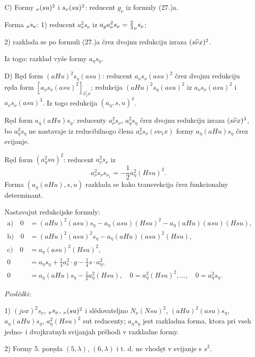 \documentclass[11pt]{article}
\let\A\relax
\newcommand{\A}{\mathfrak A}
\begin{document}
C) Formy $\A_{\nu}(\A su)^2$ i $s_{\nu}(\A su)^2$: reducent $g_{\nu}$ iz formuly (27.)a.

Forma $\A_{\nu}s_{\nu}$: 1) reducent $a_{\nu}^2s_{\nu}$ iz $a_ga_{\nu}^2s_{\nu}=\frac23\A_{\nu}s_{\nu}$;

2) razklada se po formuli (27.)a črez dvojnu redukciju izraza $(\A s\widehat{\nu}x)^2$.

Iz togo: razklad vyše formy $a_\eta s_\eta$.

D) Ręd form $(aHu)^2s_\eta(asu)$: reducent $a_{\nu}s_{\nu}(asu)^2$ črez dvojnu redukciju ręda form $[a_{\nu}s_{\nu}(asu)^2]_{\widehat{\nu_1}x}$; redukcija $(aHu)^2s_\eta(asu)^2$ iz $a_{\nu}s_{\nu}(asu)^2$ i $a_{\nu}s_{\nu}(asu)^3$. Iz togo redukcija $(a_\eta,s,u)^4$.

Ręd form $a_\eta(aHu)s_\eta$: reducenty $a_{\nu}^2s_{\nu}$, $a_\eta^2s_\eta$ črez dvojnu redukciju izraza $(\A s\widehat{\nu}x)^3$, bo $a_\eta^2s_\eta$ ne nastavaje iz reducibilnogo člena $a_{\nu}^2s_{\nu}(\nu\nu_1x)$ formy $a_\eta(aHu)s_\eta$ črez svijanje.

Ręd form $(a_\eta^2su)^2$: reducent $a_{\nu}^2s_{\nu}$ iz
\[
a_{\nu}^2s_{\nu}s_{\nu_1}=-\frac12a_\eta^2(Hsu)^2.
\]
Forma $(a_\eta(aHu),s,u)$ razklada se kako transvekcija črez funkcionalny determinant.

Nastavajut redukcijske formuly:
\[
\tag{30}
\begin{aligned}
\mathrm{a)}\quad 0&=(aHu)^2(asu)s_\eta-a_\eta(asu)(Hsu)^2-a_\eta(aHu)(asu)(Hsu),\\
\mathrm{b)}\quad 0&=(aHu)^2(asu)^2s_\eta-a_\eta(aHu)(asu)^2(Hsu),\\
\mathrm{c)}\quad 0&=a_\eta(asu)^2(Hsu)^2,\\
0&=a_\eta s_\eta+\frac14a_{\nu}^2\cdot g-\frac14s\cdot a_\eta^2,\\
0&=a_\eta(aHu)s_\eta-\frac12a_\eta^2(Hsu),
\quad 0=a_\eta^2(Hsu)^2,\ldots,
\quad 0=a_\eta^2s_\eta.
\end{aligned}
\]

\noindent\textit{Poslědki:}

1) $(j\nu x)^2s_{\nu}$, $\A_{\nu}s_{\nu}$, $\A_{\nu}(\A su)^2$ i slědovateljno $N_{\nu}(Nsu)^2$, $(aHu)^2(asu)s_\eta$, $a_\eta(aHu)s_\eta$, $a_\eta^2(Hsu)^2$ sut reducenty; $a_\eta s_\eta$ jest razkladna forma, ktora pri vseh jedno- i dvojkratnyh svijanjah prěhodi v razkladne formy.

2) Formy 5. poręda $(5,\lambda)$, $(6,\lambda)$ i t. d. ne vhodęt v svijanje s $s^2$.
\end{document}
